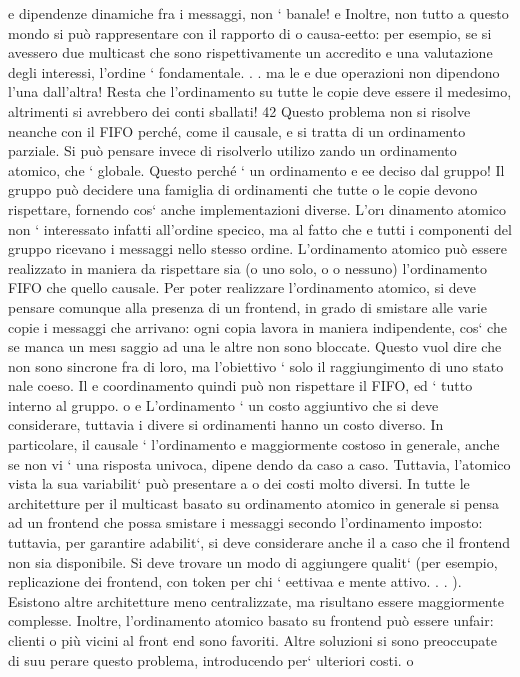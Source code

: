 \documentclass[a4paper,12pt]{article}
\begin{document}
e
dipendenze dinamiche fra i messaggi, non ` banale!
e
Inoltre, non tutto a questo mondo si può rappresentare con il rapporto di
o
causa-eetto: per esempio, se si avessero due multicast che sono rispettivamente
un accredito e una valutazione degli interessi, l'ordine ` fondamentale. . . ma le
e
due operazioni non dipendono l'una dall'altra! Resta che l'ordinamento su tutte
le copie deve essere il medesimo, altrimenti si avrebbero dei conti sballati!
42
Questo problema non si risolve neanche con il FIFO perché, come il causale,
e
si tratta di un ordinamento parziale. Si può pensare invece di risolverlo utilizo
zando un ordinamento atomico, che ` globale. Questo perché ` un ordinamento
e
ee
deciso dal gruppo! Il gruppo può decidere una famiglia di ordinamenti che tutte
o
le copie devono rispettare, fornendo cos` anche implementazioni diverse. L'or\i{}
dinamento atomico non ` interessato infatti all'ordine specico, ma al fatto che
e
tutti i componenti del gruppo ricevano i messaggi nello stesso ordine. L'ordinamento atomico può essere realizzato in
maniera da rispettare sia (o uno solo, o
o
nessuno) l'ordinamento FIFO che quello causale.
Per poter realizzare l'ordinamento atomico, si deve pensare comunque alla
presenza di un frontend, in grado di smistare alle varie copie i messaggi che
arrivano: ogni copia lavora in maniera indipendente, cos` che se manca un mes\i{}
saggio ad una le altre non sono bloccate. Questo vuol dire che non sono sincrone
fra di loro, ma l'obiettivo ` solo il raggiungimento di uno stato nale coeso. Il
e
coordinamento quindi può non rispettare il FIFO, ed ` tutto interno al gruppo.
o
e
L'ordinamento ` un costo aggiuntivo che si deve considerare, tuttavia i divere
si ordinamenti hanno un costo diverso. In particolare, il causale ` l'ordinamento
e
maggiormente costoso in generale, anche se non vi ` una risposta univoca, dipene
dendo da caso a caso. Tuttavia, l'atomico vista la sua variabilit` può presentare
a o
dei costi molto diversi.
In tutte le architetture per il multicast basato su ordinamento atomico in
generale si pensa ad un frontend che possa smistare i messaggi secondo l'ordinamento imposto: tuttavia, per garantire
adabilit`, si deve considerare anche il
a
caso che il frontend non sia disponibile. Si deve trovare un modo di aggiungere
qualit` (per esempio, replicazione dei frontend, con token per chi ` eettivaa
e
mente attivo. . . ). Esistono altre architetture meno centralizzate, ma risultano
essere maggiormente complesse.
Inoltre, l'ordinamento atomico basato su frontend può essere unfair: clienti
o
più vicini al front end sono favoriti. Altre soluzioni si sono preoccupate di suu
perare questo problema, introducendo per` ulteriori costi.
o
\end{document}
